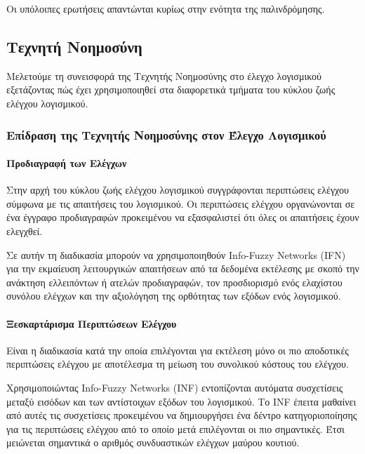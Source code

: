 \documentclass[12pt]{article}
\begin{document}
\par Οι υπόλοιπες ερωτήσεις απαντώνται κυρίως στην ενότητα της παλινδρόμησης.

\subsection{Τεχνητή Νοημοσύνη}


\par Μελετούμε τη συνεισφορά της Τεχνητής Νοημοσύνης στο έλεγχο λογισμικού εξετάζοντας πώς έχει χρησιμοποιηθεί στα διαφορετικά τμήματα του κύκλου ζωής ελέγχου λογισμικού.

\subsubsection{Επίδραση της Τεχνητής Νοημοσύνης στον Έλεγχο Λογισμικού} 


\paragraph{Προδιαγραφή των Ελέγχων}
Στην αρχή του κύκλου ζωής ελέγχου λογισμικού συγγράφονται περιπτώσεις ελέγχου σύμφωνα με τις απαιτήσεις του λογισμικού. Οι περιπτώσεις ελέγχου οργανώνονται σε ένα έγγραφο προδιαγραφών προκειμένου να εξασφαλιστεί ότι όλες οι απαιτήσεις έχουν ελεγχθεί.
\par Σε αυτήν τη διαδικασία μπορούν να χρησιμοποιηθούν Info-Fuzzy Networks (IFN) για την εκμαίευση λειτουργικών απαιτήσεων από τα δεδομένα εκτέλεσης με σκοπό την ανάκτηση ελλειπόντων ή ατελών προδιαγραφών, τον προσδιορισμό ενός ελαχίστου συνόλου ελέγχων και την αξιολόγηση της ορθότητας των εξόδων ενός λογισμικού.\cite{zubair}

\paragraph{Ξεσκαρτάρισμα Περιπτώσεων Ελέγχου}
Είναι η διαδικασία κατά την οποία επιλέγονται για εκτέλεση μόνο οι πιο αποδοτικές περιπτώσεις ελέγχου με αποτέλεσμα τη μείωση του συνολικού κόστους του ελέγχου.
\par Χρησιμοποιώντας Info-Fuzzy Networks (INF) εντοπίζονται αυτόματα συσχετίσεις μεταξύ εισόδων και των αντίστοιχων εξόδων του λογισμικού. Το INF έπειτα μαθαίνει από αυτές τις συσχετίσεις προκειμένου να δημιουργήσει ένα δέντρο κατηγοριοποίησης για τις περιπτώσεις ελέγχου από το οποίο μετά επιλέγονται οι πιο σημαντικές. Έτσι μειώνεται σημαντικά ο αριθμός συνδυαστικών ελέγχων μαύρου κουτιού.
\end{document}
